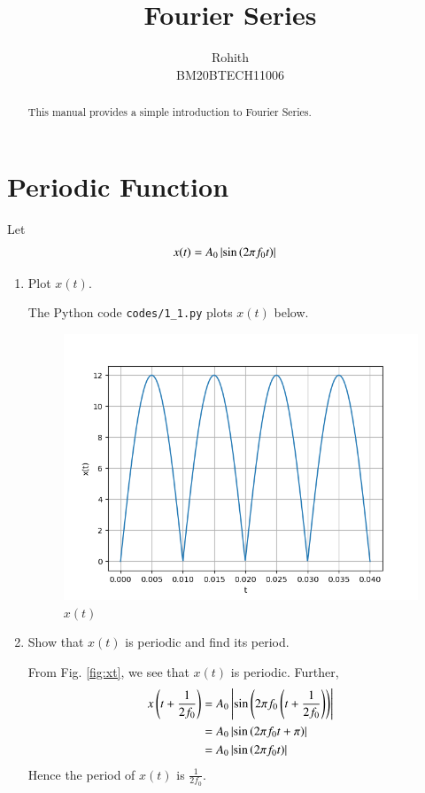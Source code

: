\documentclass[journal,12pt,twocolumn]{IEEEtran}
\renewcommand\thesection{\arabic{section}}
\begin{document}
\vspace{3cm}
\title{Fourier Series}
\author{Rohith \\BM20BTECH11006}
\maketitle
\tableofcontents
\renewcommand{\thefigure}{\theenumi}
\renewcommand{\thetable}{\theenumi}
\bigskip
\begin{abstract}
This manual provides a simple introduction to Fourier Series.
\end{abstract}
\section{Periodic Function}
Let 
\begin{align}
	x(t) &= A_0\left\vert\sin\left(2\pi f_0 t\right)\right\vert
	\label{eq:10-orig-diff-def}
\end{align}
\begin{enumerate}[label=\thesection.\arabic*
,ref=\thesection.\theenumi]
\item Plot $x(t)$.

\solution The Python code \texttt{codes/1\_1.py} plots $x(t)$ below.
\begin{figure}[!htp]
    \includegraphics[width=\columnwidth]{figs/1_1.png}
    \caption{$x(t)$}
    \label{fig:xt}
\end{figure}
\item Show that $x(t)$ is periodic and find its period.

\solution From Fig. \eqref{fig:xt}, we see that $x(t)$ is periodic. Further,
\begin{align}
    x\left(t+\frac{1}{2f_0}\right) &= A_0\left\vert\sin\left(2\pi f_0\left(t + \frac{1}{2f_0}\right)\right)\right\vert \\
                            &= A_0\left\vert\sin\left(2\pi f_0t + \pi\right)\right\vert \\
                            &= A_0\left\vert\sin\left(2\pi f_0t\right)\right\vert
\end{align}
Hence the period of $x(t)$ is $\frac{1}{2f_0}$.
\end{enumerate}
\end{document}
